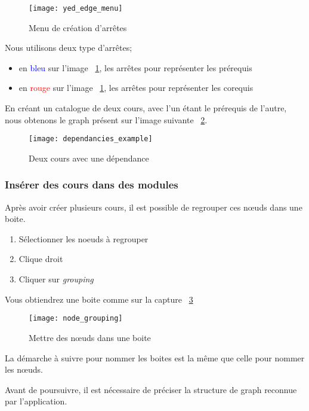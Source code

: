 \begin{figure}[H]
\centering
\caption{Menu de création d'arrêtes}
\label{fig:yed_edge_menu}
\texttt{[image: yed\_edge\_menu]}
\end{figure}

Nous utilisons deux type d'arrêtes;

\begin{itemize}
\item en \textcolor{blue}{bleu} sur l'image ~\ref{fig:yed_edge_menu}, les arrêtes pour représenter les prérequis
\item en \textcolor{red}{rouge} sur l'image ~\ref{fig:yed_edge_menu}, les arrêtes pour représenter les corequis
\end{itemize}

En créant un catalogue de deux cours, avec l'un étant le prérequis de l'autre, nous obtenons le graph présent sur l'image suivante ~\ref{fig:dependancies_example}.

\begin{figure}[H]

\label{fig:dependancies_example}
\centering
\caption{Deux cours avec une dépendance}
\texttt{[image: dependancies\_example]}

\end{figure}

\subsubsection{Insérer des cours dans des modules}
Après avoir créer plusieurs cours, il est possible de regrouper ces nœuds dans une boite.
\begin{enumerate}
\item Sélectionner les noeuds à regrouper
\item Clique droit
\item Cliquer sur \textit{grouping}
\end{enumerate}

Vous obtiendrez une boite comme sur la capture ~\ref{fig:node_grouping}

\begin{figure}[H]
\centering
\caption{Mettre des nœuds dans une boite}
\label{fig:node_grouping}
\texttt{[image: node\_grouping]}
\end{figure}

La démarche à suivre pour nommer les boites est la même que celle pour nommer les nœuds.

Avant de poursuivre, il est nécessaire de préciser la structure de graph reconnue par l'application. 

